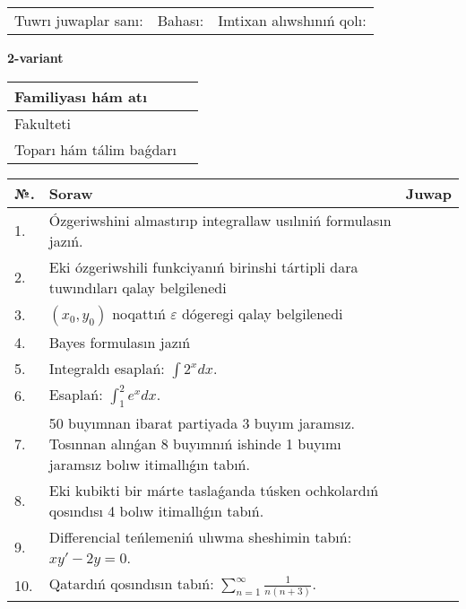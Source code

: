 \documentclass{article}
\begin{document}
\begin{tabular}{ c c c }
Tuwrı juwaplar sanı: \underline{\hspace{2cm}} & Bahası: \underline{\hspace{2cm}} & Imtixan alıwshınıń qolı: \underline{\hspace{2cm}} \\
\end{tabular}

\newpage

\begin{center}\textbf{2-variant}\end{center}

\bgroup
\def\arraystretch{1.5}
\begin{tabular}{ |m{6cm}|m{10cm}| }
  \hline
  Familiyası hám atı & \\
  \hline
  Fakulteti &\\
  \hline
  Toparı hám tálim baǵdarı & \\
  \hline
\end{tabular}
\egroup

\vspace{0.5cm}

\bgroup
\def\arraystretch{2}
\begin{tabular}{ |l|m{8cm}|m{7cm}| }
  \hline
  №. & Soraw & Juwap \\
  \hline
  1. & Ózgeriwshini almastırıp integrallaw usılıniń formulasın jazıń. &  \\
  \hline
  2. & Eki ózgeriwshili funkciyanıń birinshi tártipli dara tuwındıları qalay belgilenedi &  \\
  \hline
  3. & $(x_{0} , y_{0})$ noqattıń $\varepsilon$ dógeregi qalay belgilenedi &  \\
  \hline
  4. & Bayes formulasın jazıń &  \\
  \hline
  5. & Integraldı esaplań: $\displaystyle\int {2^{x}dx} $. &  \\
  \hline
  6. & Esaplań: $\displaystyle\int_{1}^{2}{e^{x}dx}$. &  \\
  \hline
  7. & 50 buyımnan ibarat partiyada 3 buyım jaramsız. Tosınnan alınǵan 8 buyımnıń ishinde 1 buyımı jaramsız bolıw itimallıǵın tabıń. &  \\
  \hline
  8. & Eki kubikti bir márte taslaǵanda túsken ochkolardıń qosındısı 4 bolıw itimallıǵın tabıń. &  \\
  \hline
  9. & Differencial teńlemeniń ulıwma sheshimin tabıń: $xy' - 2y = 0$. &  \\
  \hline
  10. & Qatardıń qosındısın tabıń: $\displaystyle\sum_{n = 1}^{\infty}\frac{1}{n(n + 3)}$. &  \\
  \hline
\end{tabular}
\egroup
\end{document}
